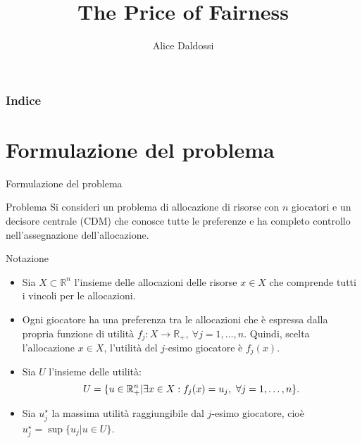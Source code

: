 \documentclass{beamer}
\title{The Price of Fairness}
\author{Alice Daldossi}
\institute{Università degli Studi di Pavia}
\date
\begin{document}
	
	\frame{\titlepage}
	
	\begin{frame}
		\frametitle{Indice}
		\tableofcontents
	\end{frame}
	
	\section{Formulazione del problema}
	
	\begin{frame}{Formulazione del problema}
		\begin{exampleblock}{Problema}
			Si consideri un problema di allocazione di risorse con $n$ giocatori e un decisore centrale (CDM) che conosce tutte le preferenze e ha completo controllo nell'assegnazione dell'allocazione. 
		\end{exampleblock}
	\end{frame}
	
	\begin{frame}
		\begin{block}{Notazione}
			\begin{itemize}
				\item Sia $X \subset \mathbb{R}^n$ l'insieme delle allocazioni delle risorse $x \in X$  che comprende tutti i vincoli per le allocazioni.\\
				\item Ogni giocatore ha una preferenza tra le allocazioni che è espressa dalla propria funzione di utilità $f_j: X \rightarrow \mathbb{R}_+, \ \forall j=1,\dots,n.$
				Quindi, scelta l'allocazione $x \in X$, l'utilità del $j$-esimo giocatore è $f_j(x)$.\\
				\item Sia $U$ l'insieme delle utilità: 
				\vspace{-0.3cm}
				\begin{equation*}
					U = \{ u \in \mathbb{R}^n_+ | \exists x \in X: f_j(x) = u_j, \ \forall j=1,\dots,n \}.
					\vspace{-0.3cm}
				\end{equation*}
				\item Sia $u_j^\star$ la massima utilità raggiungibile dal $j$-esimo giocatore, cioè $u_j^\star = \sup\{ u_j | u \in U \}$.
			\end{itemize}
		\end{block}
	\end{frame}
	
\end{document}
